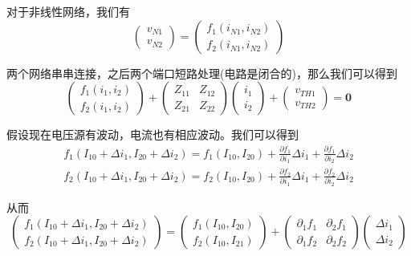 \documentclass[UTF8,openany]{ctexbook}
\begin{document}
    \par 对于非线性网络，我们有
    \[
    \begin{pmatrix}
        v_{N1} \\ v_{N2}
    \end{pmatrix}
    =
    \begin{pmatrix}
        f_1(i_{N1},i_{N2})\\
        f_2(i_{N1},i_{N2})
    \end{pmatrix}    
    \]
    \par 两个网络串串连接，之后两个端口短路处理(电路是闭合的)，那么我们可以得到
    \[
    \begin{pmatrix}
        f_1(i_1,i_2)\\f_2(i_1,i_2)
    \end{pmatrix}
    +
    \begin{pmatrix}
        Z_{11} & Z_{12} \\ Z_{21} & Z_{22}
    \end{pmatrix}
    \begin{pmatrix}
        i_1 \\ i_2
    \end{pmatrix}
    +
    \begin{pmatrix}
        v_{TH1} \\ v_{TH2}
    \end{pmatrix}
    =
    \textbf{0}  
    \]
    \par 假设现在电压源有波动，电流也有相应波动。我们可以得到
    \begin{align*}
        f_1(I_{10}+\Delta i_1,I_{20}+\Delta i_2)
        =f_1(I_{10},I_{20})+\frac{\partial f_1}{\partial i_1}\Delta i_1
        +\frac{\partial f_1}{\partial i_2}\Delta i_2 \\
        f_2(I_{10}+\Delta i_1,I_{20}+\Delta i_2)
        =f_2(I_{10},I_{20})+\frac{\partial f_2}{\partial i_1}\Delta i_1
        +\frac{\partial f_2}{\partial i_2}\Delta i_2
    \end{align*}
    \par 从而
    \[
    \begin{pmatrix}
        f_1(I_{10}+\Delta i_1,I_{20}+\Delta i_2) \\
        f_2(I_{10}+\Delta i_1,I_{20}+\Delta i_2)
    \end{pmatrix}
    =
    \begin{pmatrix}
        f_1(I_{10},I_{20}) \\ f_2(I_{10},I_{21})
    \end{pmatrix}
    +
    \begin{pmatrix}
        \partial_1 f_1 & \partial_2 f_1 \\
        \partial_1 f_2 & \partial_2 f_2
    \end{pmatrix}
    \begin{pmatrix}
        \Delta i_1 \\ \Delta i_2
    \end{pmatrix}   
    \]
\end{document}

